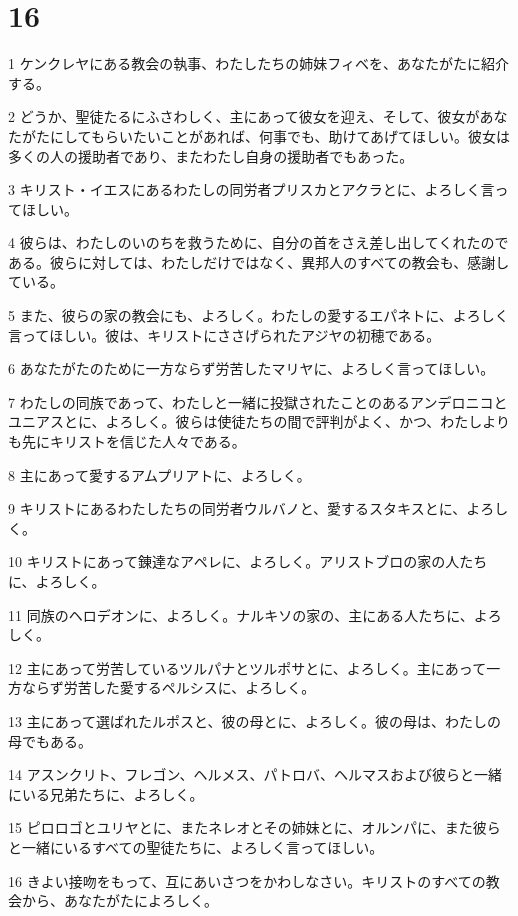 \chapter{16}

\par 1 ケンクレヤにある教会の執事、わたしたちの姉妹フィベを、あなたがたに紹介する。
\par 2 どうか、聖徒たるにふさわしく、主にあって彼女を迎え、そして、彼女があなたがたにしてもらいたいことがあれば、何事でも、助けてあげてほしい。彼女は多くの人の援助者であり、またわたし自身の援助者でもあった。
\par 3 キリスト・イエスにあるわたしの同労者プリスカとアクラとに、よろしく言ってほしい。
\par 4 彼らは、わたしのいのちを救うために、自分の首をさえ差し出してくれたのである。彼らに対しては、わたしだけではなく、異邦人のすべての教会も、感謝している。
\par 5 また、彼らの家の教会にも、よろしく。わたしの愛するエパネトに、よろしく言ってほしい。彼は、キリストにささげられたアジヤの初穂である。
\par 6 あなたがたのために一方ならず労苦したマリヤに、よろしく言ってほしい。
\par 7 わたしの同族であって、わたしと一緒に投獄されたことのあるアンデロニコとユニアスとに、よろしく。彼らは使徒たちの間で評判がよく、かつ、わたしよりも先にキリストを信じた人々である。
\par 8 主にあって愛するアムプリアトに、よろしく。
\par 9 キリストにあるわたしたちの同労者ウルバノと、愛するスタキスとに、よろしく。
\par 10 キリストにあって錬達なアペレに、よろしく。アリストブロの家の人たちに、よろしく。
\par 11 同族のヘロデオンに、よろしく。ナルキソの家の、主にある人たちに、よろしく。
\par 12 主にあって労苦しているツルパナとツルポサとに、よろしく。主にあって一方ならず労苦した愛するペルシスに、よろしく。
\par 13 主にあって選ばれたルポスと、彼の母とに、よろしく。彼の母は、わたしの母でもある。
\par 14 アスンクリト、フレゴン、ヘルメス、パトロバ、ヘルマスおよび彼らと一緒にいる兄弟たちに、よろしく。
\par 15 ピロロゴとユリヤとに、またネレオとその姉妹とに、オルンパに、また彼らと一緒にいるすべての聖徒たちに、よろしく言ってほしい。
\par 16 きよい接吻をもって、互にあいさつをかわしなさい。キリストのすべての教会から、あなたがたによろしく。
